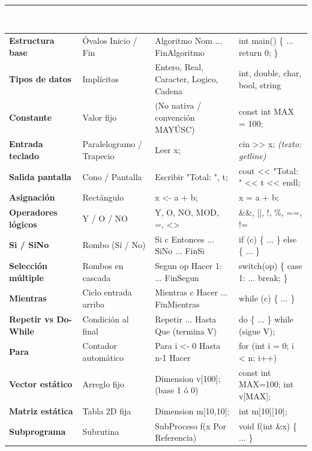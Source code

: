 \documentclass[10pt,letterpaper]{article}
\begin{document}
\vspace{-6pt}
\begin{center}
  \scriptsize
  \renewcommand{\arraystretch}{1.18}
  \begin{tabularx}{\textwidth}{>{\bfseries\sffamily\color{AzulMarino}}p{2.7cm} >{\raggedright\arraybackslash}p{2.8cm} >{\ttfamily\raggedright\arraybackslash}X >{\ttfamily\raggedright\arraybackslash}X}
    \rowcolor{AzulMarino}
    \textcolor{white}{\textbf{Concepto}} & \textcolor{white}{\textbf{DFD}} & \textcolor{white}{\textbf{\sffamily PSeInt (español)}} & \textcolor{white}{\textbf{\sffamily C++ básico (C++17)}} \\
    \midrule
    Estructura base & Óvalos Inicio / Fin & Algoritmo Nom ... FinAlgoritmo & int main() \{ ... return 0; \} \\
    Tipos de datos & Implícitos & Entero, Real, Caracter, Logico, Cadena & int, double, char, bool, string \\
    Constante & Valor fijo & (No nativa / convención MAYÚSC) & const int MAX = 100; \\
    Entrada teclado & Paralelogramo / Trapecio & Leer x; & cin >> x; \textit{(texto: getline)} \\
    Salida pantalla & Cono / Pantalla & Escribir "Total: ", t; & cout << "Total: " << t << endl; \\
    Asignación & Rectángulo & x <- a + b; & x = a + b; \\
    Operadores lógicos & Y / O / NO & Y, O, NO, MOD, =, <> & \&\&, ||, !, \%, ==, != \\
    Si / SiNo & Rombo (Sí / No) & Si c Entonces ... SiNo ... FinSi & if (c) \{ ... \} else \{ ... \} \\
    Selección múltiple & Rombos en cascada & Segun op Hacer 1: ... FinSegun & switch(op) \{ case 1: ... break; \} \\
    Mientras & Ciclo entrada arriba & Mientras c Hacer ... FinMientras & while (c) \{ ... \} \\
    Repetir vs Do-While & Condición al final & Repetir ... Hasta Que (termina V) & do \{ ... \} while (sigue V); \\
    Para & Contador automático & Para i <- 0 Hasta n-1 Hacer & for (int i = 0; i < n; i++) \\
    Vector estático & Arreglo fijo & Dimension v[100]; (base 1 ó 0) & const int MAX=100; int v[MAX]; \\
    Matriz estática & Tabla 2D fija & Dimension m[10,10]; & int m[10][10]; \\
    Subprograma & Subrutina & SubProceso f(x Por Referencia) & void f(int \&x) \{ ... \} \\
    \bottomrule
  \end{tabularx}
\end{center}
\end{document}
